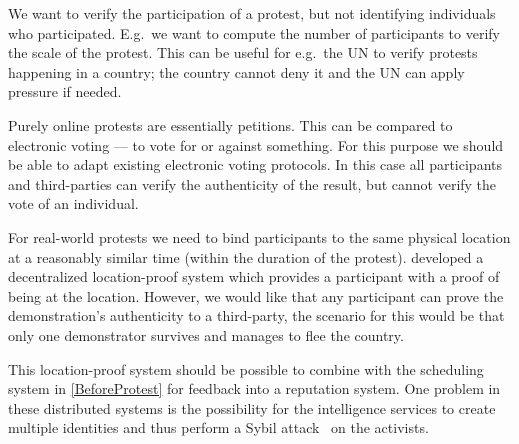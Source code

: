 We want to verify the participation of a protest, but not identifying 
individuals who participated.
E.g.\ we want to compute the number of participants to verify the scale of the 
protest.
This can be useful for e.g.\ the UN to verify protests happening in a country; 
the country cannot deny it and the UN can apply pressure if needed.

Purely online protests are essentially petitions.
This can be compared to electronic voting --- to vote for or against something.
For this purpose we should be able to adapt existing electronic voting 
protocols.
In this case all participants and third-parties can verify the authenticity of 
the result, but cannot verify the vote of an individual.

For real-world protests we need to bind participants to the same physical 
location at a reasonably similar time (within the duration of the protest).
\citet{PROPS} developed a decentralized location-proof system which provides 
a participant with a proof of being at the location.
However, we would like that any participant can prove the demonstration's 
authenticity to a third-party, the scenario for this would be that only one 
demonstrator survives and manages to flee the country.

This location-proof system should be possible to combine with the scheduling 
system in \cref{BeforeProtest} for feedback into a reputation system.
One problem in these distributed systems is the possibility for the 
intelligence services to create multiple identities and thus perform a Sybil 
attack~\cite{SybilAttack} on the activists.

